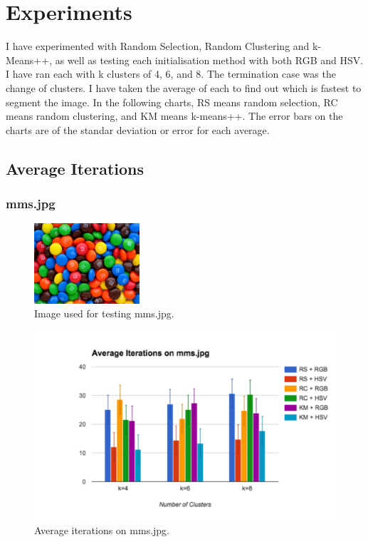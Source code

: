 \documentclass{article}
\begin{document}

\section{Experiments}

I have experimented with Random Selection, Random Clustering and k-Means++, as
well as testing each initialisation method with both RGB and HSV. I have ran
each with k clusters of 4, 6, and 8. The termination case was the change of
clusters. I have taken the average of each to find out which is fastest to
segment the image. In the following charts, RS means random selection, RC means
random clustering, and KM means k-means++. The error bars on the charts are of
the standar deviation or error for each average.

\subsection{Average Iterations}

\subsubsection{mms.jpg}

\begin{figure}[ht]
\begin{center}
\includegraphics[width=0.35\textwidth]{images/mms}
\caption{Image used for testing mms.jpg.}
\label{fig:mmsTest}
\end{center}
\end{figure}

\begin{figure}[ht]
\begin{center}
\includegraphics[width=1\textwidth]{images/mmsChart}
\caption{Average iterations on mms.jpg.}
\label{fig:mmsChart}
\end{center}
\end{figure}
\end{document}
